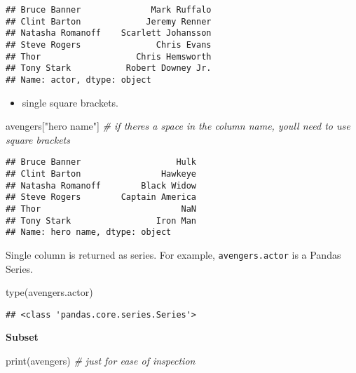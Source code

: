 \documentclass[
]{book}
\newenvironment{Shaded}{\begin{snugshade}}{\end{snugshade}}
\newcommand{\BuiltInTok}[1]{#1}
\newcommand{\CommentTok}[1]{\textcolor[rgb]{0.56,0.35,0.01}{\textit{#1}}}
\newcommand{\NormalTok}[1]{#1}
\newcommand{\StringTok}[1]{\textcolor[rgb]{0.31,0.60,0.02}{#1}}
\providecommand{\tightlist}{%
  \setlength{\itemsep}{0pt}\setlength{\parskip}{0pt}}
\begin{document}
\begin{verbatim}
## Bruce Banner              Mark Ruffalo
## Clint Barton             Jeremy Renner
## Natasha Romanoff    Scarlett Johansson
## Steve Rogers               Chris Evans
## Thor                   Chris Hemsworth
## Tony Stark           Robert Downey Jr.
## Name: actor, dtype: object
\end{verbatim}

\begin{itemize}
\tightlist
\item
  single square brackets.
\end{itemize}

\begin{Shaded}
\begin{Highlighting}[]
\NormalTok{avengers[}\StringTok{"hero name"}\NormalTok{] }\CommentTok{\# if there\textquotesingle{}s a space in the column name, you\textquotesingle{}ll need to use square brackets}
\end{Highlighting}
\end{Shaded}

\begin{verbatim}
## Bruce Banner                   Hulk
## Clint Barton                Hawkeye
## Natasha Romanoff        Black Widow
## Steve Rogers        Captain America
## Thor                            NaN
## Tony Stark                 Iron Man
## Name: hero name, dtype: object
\end{verbatim}

Single column is returned as series. For example, \texttt{avengers.actor} is a Pandas Series.

\begin{Shaded}
\begin{Highlighting}[]
\BuiltInTok{type}\NormalTok{(avengers.actor)}
\end{Highlighting}
\end{Shaded}

\begin{verbatim}
## <class 'pandas.core.series.Series'>
\end{verbatim}

\textbf{Subset}

\begin{Shaded}
\begin{Highlighting}[]
\BuiltInTok{print}\NormalTok{(avengers) }\CommentTok{\# just for ease of inspection}
\end{Highlighting}
\end{Shaded}
\end{document}
